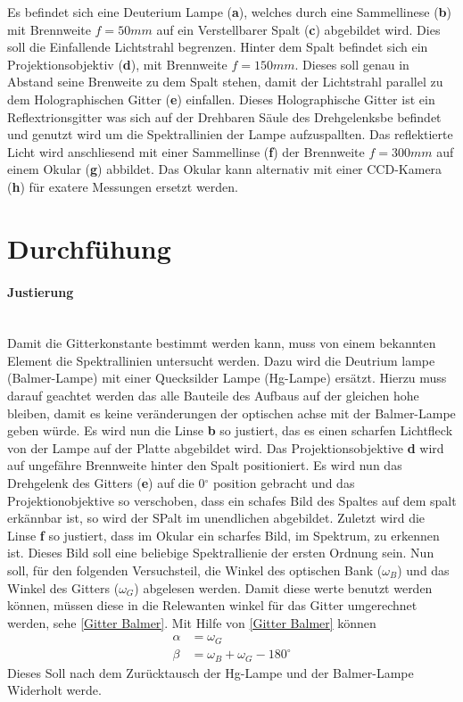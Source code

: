 Es befindet sich eine Deuterium Lampe (\textbf{a}), welches durch eine Sammellinese (\textbf{b}) mit Brennweite $f = 50mm$ auf ein Verstellbarer Spalt (\textbf{c}) abgebildet wird. 
Dies soll die Einfallende Lichtstrahl begrenzen. 
Hinter dem Spalt befindet sich ein Projektionsobjektiv (\textbf{d}), mit Brennweite $f = 150mm$. 
Dieses soll genau in Abstand seine Brenweite zu dem Spalt stehen, damit der Lichtstrahl parallel zu dem Holographischen Gitter (\textbf{e}) einfallen. 
Dieses Holographische Gitter ist ein Reflextrionsgitter was sich auf der Drehbaren Säule des Drehgelenksbe befindet und genutzt wird um die Spektrallinien der Lampe aufzuspallten. 
Das reflektierte Licht wird anschliesend mit einer Sammellinse (\textbf{f}) der Brennweite $f=300mm$ auf einem Okular (\textbf{g}) abbildet.
Das Okular kann alternativ mit einer CCD-Kamera (\textbf{h}) für exatere Messungen ersetzt werden.

\section{Durchfühung}

\paragraph{Justierung}\\

Damit die Gitterkonstante bestimmt werden kann, muss von einem bekannten Element die Spektrallinien untersucht werden. 
Dazu wird die Deutrium lampe (Balmer-Lampe) mit einer Quecksilder Lampe (Hg-Lampe) ersätzt. 
Hierzu muss darauf geachtet werden das alle Bauteile des Aufbaus auf der gleichen hohe bleiben, damit es keine veränderungen der optischen achse mit der Balmer-Lampe geben würde.
Es wird nun die Linse \textbf{b} so justiert, das es einen scharfen Lichtfleck von der Lampe auf der Platte abgebildet wird.
Das Projektionsobjektive \textbf{d} wird auf ungefähre Brennweite hinter den Spalt positioniert. 
Es wird nun das Drehgelenk des Gitters (\textbf{e}) auf die 0$^\circ$ position gebracht und das Projektionobjektive so verschoben, dass ein schafes Bild des Spaltes auf dem spalt erkännbar ist, so wird der SPalt im unendlichen abgebildet.
Zuletzt wird die Linse \textbf{f} so justiert, dass im Okular ein scharfes Bild, im Spektrum, zu erkennen ist. Dieses Bild soll eine beliebige Spektrallienie der ersten Ordnung sein.
Nun soll, für den folgenden Versuchsteil, die Winkel des optischen Bank ($\omega_B$) und das Winkel des Gitters ($\omega_G$) abgelesen werden.  
Damit diese werte benutzt werden können, müssen diese in die Relewanten winkel für das Gitter umgerechnet werden, sehe \cref{Gitter Balmer}. 
Mit Hilfe von \cref{Gitter Balmer} können 
\begin{align}
    \alpha &= \omega_G \\  \beta &= \omega_B + \omega_G - 180^\circ 
\end{align}
Dieses Soll nach dem Zurücktausch der Hg-Lampe und der Balmer-Lampe Widerholt werde. 


